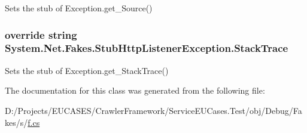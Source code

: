 Sets the stub of Exception.\-get\-\_\-\-Source()

\hypertarget{class_system_1_1_net_1_1_fakes_1_1_stub_http_listener_exception_aacb9a45cf4db35f5d7f35c98e3ba6c66}{
\subsubsection[{Stack\-Trace}]{\setlength{\rightskip}{0pt plus 5cm}override string System.\-Net.\-Fakes.\-Stub\-Http\-Listener\-Exception.\-Stack\-Trace\hspace{0.3cm}{\ttfamily [get]}}}\label{class_system_1_1_net_1_1_fakes_1_1_stub_http_listener_exception_aacb9a45cf4db35f5d7f35c98e3ba6c66}


Sets the stub of Exception.\-get\-\_\-\-Stack\-Trace()



The documentation for this class was generated from the following file\-:\begin{DoxyCompactItemize}
\item 
D\-:/\-Projects/\-E\-U\-C\-A\-S\-E\-S/\-Crawler\-Framework/\-Service\-E\-U\-Cases.\-Test/obj/\-Debug/\-Fakes/s/\hyperlink{s_2f_8cs}{f.\-cs}\end{DoxyCompactItemize}
